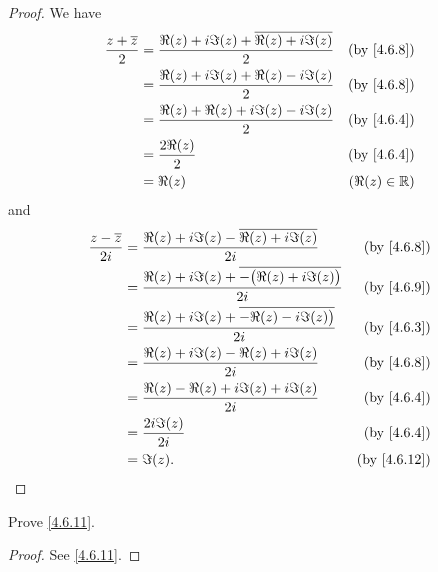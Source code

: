 \begin{proof}
  We have
  \begin{align*}
    \frac{z + \overline{z}}{2} & = \frac{\Re(z) + i \Im(z) + \overline{\Re(z) + i \Im(z)}}{2} & \text{(by \cref{4.6.8})} \\
                               & = \frac{\Re(z) + i \Im(z) + \Re(z) - i \Im(z)}{2}            & \text{(by \cref{4.6.8})} \\
                               & = \frac{\Re(z) + \Re(z) + i \Im(z) - i \Im(z)}{2}            & \text{(by \cref{4.6.4})} \\
                               & = \frac{2 \Re(z)}{2}                                         & \text{(by \cref{4.6.4})} \\
                               & = \Re(z)                                                     & (\Re(z) \in \R)
  \end{align*}
  and
  \begin{align*}
    \frac{z - \overline{z}}{2i} & = \frac{\Re(z) + i \Im(z) - \overline{\Re(z) + i \Im(z)}}{2i}            & \text{(by \cref{4.6.8})}  \\
                                & = \frac{\Re(z) + i \Im(z) + \overline{-\big(\Re(z) + i \Im(z)\big)}}{2i} & \text{(by \cref{4.6.9})}  \\
                                & = \frac{\Re(z) + i \Im(z) + \overline{-\Re(z) - i \Im(z)\big)}}{2i}      & \text{(by \cref{4.6.3})}  \\
                                & = \frac{\Re(z) + i \Im(z) - \Re(z) + i \Im(z)}{2i}                       & \text{(by \cref{4.6.8})}  \\
                                & = \frac{\Re(z) - \Re(z) + i \Im(z) + i \Im(z)}{2i}                       & \text{(by \cref{4.6.4})}  \\
                                & = \frac{2i \Im(z)}{2i}                                                   & \text{(by \cref{4.6.4})}  \\
                                & = \Im(z).                                                                & \text{(by \cref{4.6.12})}
  \end{align*}
\end{proof}

\begin{ex}\label{ex:4.6.6}
  Prove \cref{4.6.11}.
\end{ex}

\begin{proof}
  See \cref{4.6.11}.
\end{proof}

